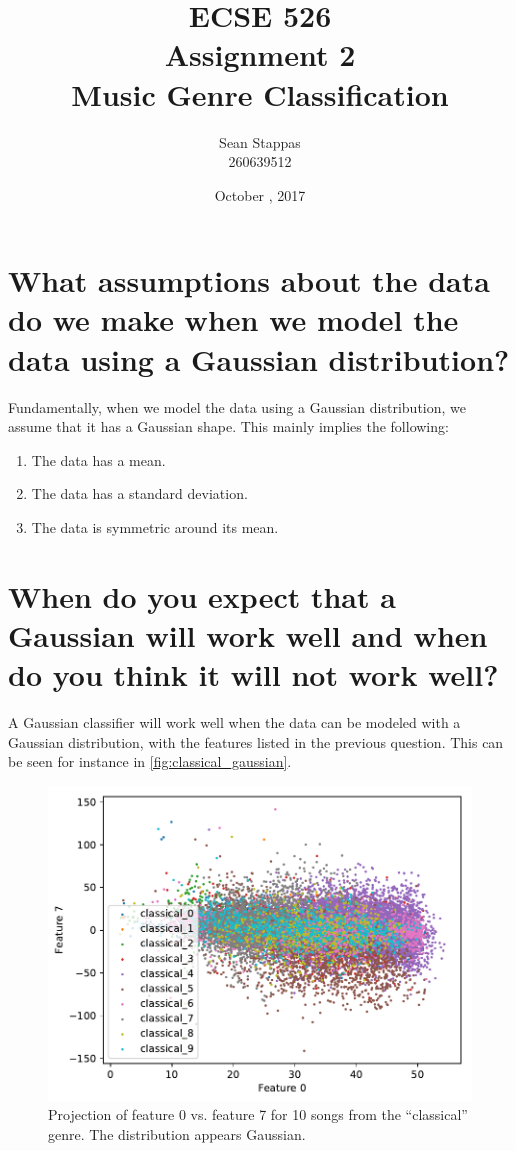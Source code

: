 \documentclass[a4paper,titlepage]{article}
\title{
	\textbf{ECSE 526 \\ Assignment 2}
	\\ \large Music Genre Classification
}
\author{Sean Stappas \\ 260639512}
\date{October \nth{19}, 2017}
\begin{document}
	\sloppy
	\maketitle
	\twocolumn
	
	\section{What assumptions about the data do we make when we model the data using a Gaussian distribution?}
	
	Fundamentally, when we model the data using a Gaussian distribution, we assume that it has a Gaussian shape. This mainly implies the following:
	
	\begin{enumerate}
		\item The data has a mean.
		\item The data has a standard deviation.
		\item The data is symmetric around its mean.
	\end{enumerate}
	
	
	\section{When do you expect that a Gaussian will work well and when do you think it will not work well?}
	
	A Gaussian classifier will work well when the data can be modeled with a Gaussian distribution, with the features listed in the previous question. This can be seen for instance in \autoref{fig:classical_gaussian}.
	
	\begin{figure}[!htb]
		\centering
		\includegraphics[width=\columnwidth]{plots/classical_gaussian.pdf}
		\caption
		{Projection of feature 0 vs. feature 7 for 10 songs from the ``classical'' genre. The distribution appears Gaussian.}
		\label{fig:classical_gaussian}
	\end{figure}
	
\end{document}
